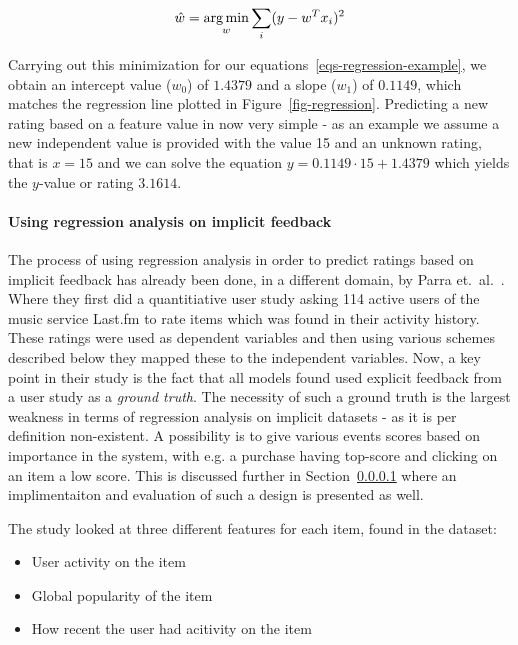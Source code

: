 \begin{equation}
  \label{least-squares}
  \hat{w} = \operatorname*{arg\,min}_w \sum_{i} (y - w^{T}x_{i})^2
\end{equation}

Carrying out this minimization for our equations~\ref{eqs-regression-example},
we obtain an intercept value ($w_0$) of $1.4379$ and a slope ($w_1$) of
$0.1149$, which matches the regression line plotted in
Figure~\ref{fig-regression}. Predicting a new rating based on a feature value
in now very simple - as an example we assume a new independent value is
provided with the value 15 and an unknown rating, that is $x=15$ and we can
solve the equation $y = 0.1149 \cdot 15 + 1.4379$ which yields the $y$-value or
rating $3.1614$.

\paragraph{Using regression analysis on implicit feedback}

The process of using regression analysis in order to predict ratings based on
implicit feedback has already been done, in a different domain, by Parra et.\
al.~\cite{parra2011walk}. Where they first did a quantitiative user study
asking 114 active users of the music service Last.fm to rate items which was
found in their activity history. These ratings were used as dependent variables
and then using various schemes described below they mapped these to the
independent variables. Now, a key point in their study is the fact that all
models found used explicit feedback from a user study as a \textit{ground
truth}. The necessity of such a ground truth is the largest weakness in terms
of regression analysis on implicit datasets - as it is per definition
non-existent. A possibility is to give various events scores based on
importance in the system, with e.g. a purchase having top-score and clicking on
an item a low score. This is discussed further in Section~\ref{} where an
implimentaiton and evaluation of such a design is presented as well.

The study looked at three different features for each item, found in the
dataset:

\begin{itemize}
  \item User activity on the item
  \item Global popularity of the item
  \item How recent the user had acitivity on the item
\end{itemize}


